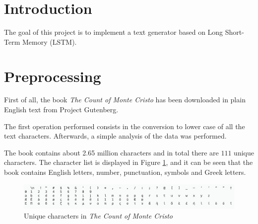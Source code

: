 \documentclass[a4paper,12pt]{article} %
\begin{document}
	\thispagestyle{empty}  
	\vspace{0.4cm}

	
	\section{Introduction}
	\label{section:intro}
	The goal of this project is to implement a text generator based on Long 
	Short-Term Memory (LSTM).
	
	\section{Preprocessing}
	\label{section:preprocessing}
	First of all, the book \textit{The Count of Monte Cristo} has been  
	downloaded in plain English text from Project Gutenberg.
	
	The first operation performed consists in the conversion to lower case of 
	all the text characters. Afterwards, a simple analysis of the data was 
	performed.
	
	The book contains about 2.65 million characters and in total there are 
	$111$ unique characters. The character list is displayed in Figure 
	\ref{fig:initial}, and it can be seen that the book contains English 
	letters, number, punctuation, symbols and Greek letters.
	
	\begin{figure}[htb]
		\centering
		\includegraphics[width=\linewidth]{initial.png}	
		\caption{Unique characters in \textit{The Count of Monte Cristo}}
		\label{fig:initial}
	\end{figure}
\end{document}
